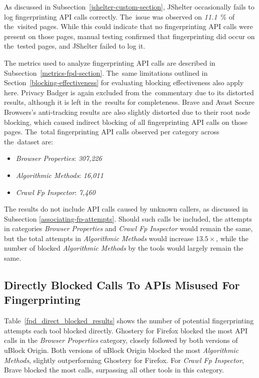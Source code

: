 As discussed in Subsection~\ref{jshelter-custom-section}, JShelter occasionally fails to log fingerprinting API calls correctly. The~issue was observed on \emph{11.1}~\% of the~visited pages. While this could indicate that no fingerprinting API calls were present on those pages, manual testing confirmed that fingerprinting did occur on the~tested pages, and JShelter failed to log it.

The metrics used to analyze fingerprinting API calls are described in Subsection~\ref{metrics-fpd-section}. The~same limitations outlined in Section~\ref{blocking-effectiveness} for evaluating blocking effectiveness also apply here. Privacy Badger is again excluded from the~commentary due to its distorted results, although it is left in the~results for completeness. Brave and Avast Secure Browsers's anti-tracking results are also slightly distorted due to their root node blocking, which caused indirect blocking of all fingerprinting API calls on those pages. The~total fingerprinting API calls observed per category across the~dataset are:

\begin{itemize}
\setlength\itemsep{0em}
    \item \textit{Browser Properties}: \textit{307,226}
    \item \textit{Algorithmic Methods}: \textit{16,011}
    \item \textit{Crawl Fp Inspector}: \textit{7,460}
\end{itemize}

The results do not include API calls caused by unknown callers, as discussed in Subsection \ref{associating-fp-attempts}. Should such calls be included, the attempts in categories \emph{Browser Properties} and \emph{Crawl Fp Inspector} would remain the same, but the total attempts in \emph{Algorithmic Methods} would increase $13.5\times$, while the number of blocked \emph{Algorithmic Methods} by the tools would largely remain the same.


\subsection{Directly Blocked Calls To APIs Misused For Fingerprinting}
Table~\ref{fpd_direct_blocked_results} shows the number of potential fingerprinting attempts each tool blocked directly.
Ghostery for Firefox blocked the most API calls in the \textit{Browser Properties} category, closely followed by both versions of uBlock Origin. Both versions of uBlock Origin blocked the most \textit{Algorithmic Methods}, slightly outperforming Ghostery for Firefox. For \textit{Crawl Fp Inspector}, Brave blocked the most calls, surpassing all other tools in this category.



